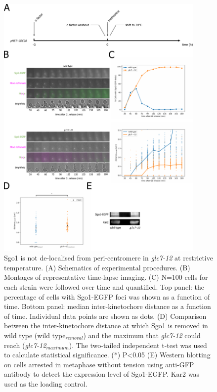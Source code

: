 \begin{figure}[htbp]
  \centering
  \includegraphics[width=0.9\textwidth]{chapter3/figures/Sgo1 glc7-12.pdf}
  \caption[Sgo1 is not de-localised from peri-centromere in \textit{glc7-12} at restrictive temperature]{Sgo1 is not de-localised from peri-centromere in \textit{glc7-12} at restrictive temperature. (A) Schematics of experimental procedures. (B) Montages of representative time-lapse imaging. (C) N=100 cells for each strain were followed over time and quantified. Top panel: the percentage of cells with Sgo1-EGFP foci was shown as a function of time. Bottom panel: median inter-kinetochore distance as a function of time. Individual data points are shown as dots. (D) Comparison between the inter-kinetochore distance at which Sgo1 is removed in wild type (wild type$_{removal}$) and the maximum that \textit{glc7-12} could reach (\textit{glc7-12}$_{maximum}$). The two-tailed independent t-test was used to calculate statistical significance. (*) P<0.05 (E) Western blotting on cells arrested in metaphase without tension using anti-GFP antibody to detect the expression level of Sgo1-EGFP. Kar2 was used as the loading control.}
  \label{fig:sgo1glc712}
\end{figure}

